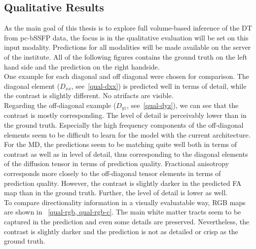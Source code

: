 \subsection{Qualitative Results}
As the main goal of this thesis is to explore full volume-based inference of the DT from pc-bSSFP data, the focus is in the qualitative evaluation will be set on this input modality.
Predictions for all modalities will be made available on the server of the institute.
All of the following figures contains the ground truth on the left hand side and the prediction on the right handside. \\

One example for each diagonal and off diagonal were chosen for comparison.
The diagonal element ($D_{xx}$, see~\ref{qual-dxx}) is predicted well in terms of detail, while the contrast is slightly different.
No atrifacts are visible. \\

Regarding the off-diagonal example ($D_{yz}$, see~\ref{qual-dyz}), we can see that the contrast is mostly corresponding.
The level of detail is perceivably lower than in the ground truth.
Especially the high frequency components of the off-diagonal elements seem to be difficult to learn for the model with the current architecture. \\


For the MD, the predictions seem to be matching quite well both in terms of contrast as well as in level of detail, thus corresponding to the diagonal elements of the diffusion tensor in terms of prediction quality.
Fractional anisotropy corresponds more closely to the off-diagonal tensor elements in terms of prediction quality.
However, the contrast is slightly darker in the predicted FA map than in the ground truth.
Further, the level of detail is lower as well. \\

To compare directionality information in a visually evaluatable way, RGB maps are shown in ~\ref{qual-rgb, qual-rgb-c}.
The main white matter tracts seem to be captured in the prediction and even some details are preserved.
Nevertheless, the contrast is slightly darker and the prediction is not as detailed or crisp as the ground truth. \\
